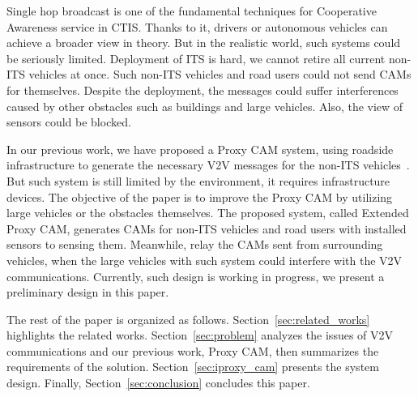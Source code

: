 Single hop broadcast is one of the fundamental techniques for Cooperative Awareness service in CTIS.
Thanks to it, drivers or autonomous vehicles can achieve a broader view in theory.
But in the realistic world, such systems could be seriously limited.
Deployment of ITS is hard, we cannot retire all current non-ITS vehicles at once.
Such non-ITS vehicles and road users could not send CAMs for themselves.
Despite the deployment, the messages could suffer interferences caused by other obstacles such as buildings and large vehicles.
Also, the view of sensors could be blocked.

In our previous work, we have proposed a Proxy CAM system,
using roadside infrastructure to generate the necessary V2V messages for the non-ITS vehicles~\cite{kitazato2016proxy}.
But such system is still limited by the environment, it requires infrastructure devices.
The objective of the paper is to improve the Proxy CAM by utilizing large vehicles or the obstacles themselves.
The proposed system, called Extended Proxy CAM,
generates CAMs for non-ITS vehicles and road users with installed sensors to sensing them.
Meanwhile, relay the CAMs sent from surrounding vehicles, when the large vehicles with such system could interfere with the V2V communications.
Currently, such design is working in progress, we present a preliminary design in this paper.

The rest of the paper is organized as follows.
Section~\ref{sec:related_works} highlights the related works.
Section~\ref{sec:problem} analyzes the issues of V2V communications and our previous work, Proxy CAM,
then summarizes the requirements of the solution.
Section~\ref{sec:iproxy_cam} presents the system design.
Finally, Section~\ref{sec:conclusion} concludes this paper.